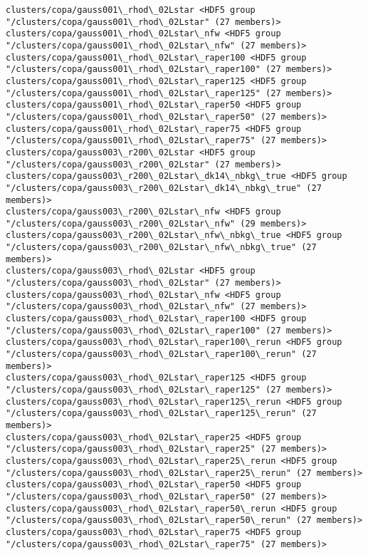 \documentclass[11pt]{article}
\begin{document}
\begin{Verbatim}[commandchars=\\\{\}]
clusters/copa/gauss001\_rhod\_02Lstar <HDF5 group "/clusters/copa/gauss001\_rhod\_02Lstar" (27 members)>
clusters/copa/gauss001\_rhod\_02Lstar\_nfw <HDF5 group "/clusters/copa/gauss001\_rhod\_02Lstar\_nfw" (27 members)>
clusters/copa/gauss001\_rhod\_02Lstar\_raper100 <HDF5 group "/clusters/copa/gauss001\_rhod\_02Lstar\_raper100" (27 members)>
clusters/copa/gauss001\_rhod\_02Lstar\_raper125 <HDF5 group "/clusters/copa/gauss001\_rhod\_02Lstar\_raper125" (27 members)>
clusters/copa/gauss001\_rhod\_02Lstar\_raper50 <HDF5 group "/clusters/copa/gauss001\_rhod\_02Lstar\_raper50" (27 members)>
clusters/copa/gauss001\_rhod\_02Lstar\_raper75 <HDF5 group "/clusters/copa/gauss001\_rhod\_02Lstar\_raper75" (27 members)>
clusters/copa/gauss003\_r200\_02Lstar <HDF5 group "/clusters/copa/gauss003\_r200\_02Lstar" (27 members)>
clusters/copa/gauss003\_r200\_02Lstar\_dk14\_nbkg\_true <HDF5 group "/clusters/copa/gauss003\_r200\_02Lstar\_dk14\_nbkg\_true" (27 members)>
clusters/copa/gauss003\_r200\_02Lstar\_nfw <HDF5 group "/clusters/copa/gauss003\_r200\_02Lstar\_nfw" (29 members)>
clusters/copa/gauss003\_r200\_02Lstar\_nfw\_nbkg\_true <HDF5 group "/clusters/copa/gauss003\_r200\_02Lstar\_nfw\_nbkg\_true" (27 members)>
clusters/copa/gauss003\_rhod\_02Lstar <HDF5 group "/clusters/copa/gauss003\_rhod\_02Lstar" (27 members)>
clusters/copa/gauss003\_rhod\_02Lstar\_nfw <HDF5 group "/clusters/copa/gauss003\_rhod\_02Lstar\_nfw" (27 members)>
clusters/copa/gauss003\_rhod\_02Lstar\_raper100 <HDF5 group "/clusters/copa/gauss003\_rhod\_02Lstar\_raper100" (27 members)>
clusters/copa/gauss003\_rhod\_02Lstar\_raper100\_rerun <HDF5 group "/clusters/copa/gauss003\_rhod\_02Lstar\_raper100\_rerun" (27 members)>
clusters/copa/gauss003\_rhod\_02Lstar\_raper125 <HDF5 group "/clusters/copa/gauss003\_rhod\_02Lstar\_raper125" (27 members)>
clusters/copa/gauss003\_rhod\_02Lstar\_raper125\_rerun <HDF5 group "/clusters/copa/gauss003\_rhod\_02Lstar\_raper125\_rerun" (27 members)>
clusters/copa/gauss003\_rhod\_02Lstar\_raper25 <HDF5 group "/clusters/copa/gauss003\_rhod\_02Lstar\_raper25" (27 members)>
clusters/copa/gauss003\_rhod\_02Lstar\_raper25\_rerun <HDF5 group "/clusters/copa/gauss003\_rhod\_02Lstar\_raper25\_rerun" (27 members)>
clusters/copa/gauss003\_rhod\_02Lstar\_raper50 <HDF5 group "/clusters/copa/gauss003\_rhod\_02Lstar\_raper50" (27 members)>
clusters/copa/gauss003\_rhod\_02Lstar\_raper50\_rerun <HDF5 group "/clusters/copa/gauss003\_rhod\_02Lstar\_raper50\_rerun" (27 members)>
clusters/copa/gauss003\_rhod\_02Lstar\_raper75 <HDF5 group "/clusters/copa/gauss003\_rhod\_02Lstar\_raper75" (27 members)>

\end{Verbatim}
\end{document}
